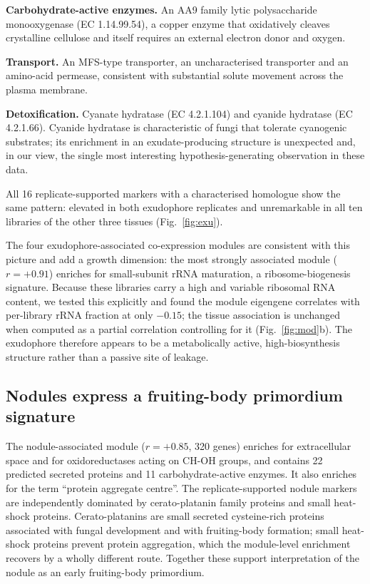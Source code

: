\textbf{Carbohydrate-active enzymes.} An AA9 family lytic polysaccharide monooxygenase
(EC 1.14.99.54), a copper enzyme that oxidatively cleaves crystalline cellulose and itself
requires an external electron donor and oxygen.

\textbf{Transport.} An MFS-type transporter, an uncharacterised transporter and an amino-acid
permease, consistent with substantial solute movement across the plasma membrane.

\textbf{Detoxification.} Cyanate hydratase (EC 4.2.1.104) and cyanide hydratase (EC 4.2.1.66).
Cyanide hydratase is characteristic of fungi that tolerate cyanogenic substrates; its
enrichment in an exudate-producing structure is unexpected and, in our view, the single most
interesting hypothesis-generating observation in these data.

All 16 replicate-supported markers with a characterised homologue show the same pattern:
elevated in both exudophore replicates and unremarkable in all ten libraries of the other three
tissues (Fig.~\ref{fig:exu}).

The four exudophore-associated co-expression modules are consistent with this picture and add a
growth dimension: the most strongly associated module ($r=+0.91$) enriches for small-subunit
rRNA maturation, a ribosome-biogenesis signature. Because these libraries carry a high and
variable ribosomal RNA content, we tested this explicitly and found the module eigengene
correlates with per-library rRNA fraction at only $-0.15$; the tissue association is unchanged
when computed as a partial correlation controlling for it (Fig.~\ref{fig:mod}b). The exudophore therefore appears to
be a metabolically active, high-biosynthesis structure rather than a passive site of leakage.

\subsection{Nodules express a fruiting-body primordium signature}

The nodule-associated module ($r=+0.85$, 320 genes) enriches for extracellular space and for
oxidoreductases acting on CH-OH groups, and contains 22 predicted secreted proteins and 11
carbohydrate-active enzymes. It also enriches for the term ``protein aggregate centre''. The
replicate-supported nodule markers are independently dominated by cerato-platanin family
proteins and small heat-shock proteins. Cerato-platanins are small secreted cysteine-rich
proteins associated with fungal development and with fruiting-body formation; small heat-shock
proteins prevent protein aggregation, which the module-level enrichment recovers by a wholly
different route. Together these support interpretation of the nodule as an early
fruiting-body primordium.

